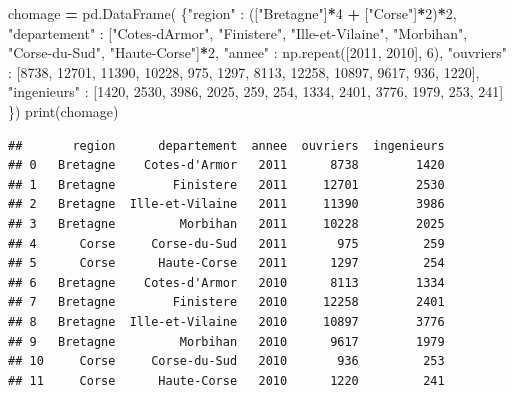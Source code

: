 \documentclass[
  12pt,
]{book}
\newenvironment{Shaded}{\begin{snugshade}}{\end{snugshade}}
\newcommand{\BuiltInTok}[1]{#1}
\newcommand{\DecValTok}[1]{\textcolor[rgb]{0.00,0.00,0.81}{#1}}
\newcommand{\NormalTok}[1]{#1}
\newcommand{\OperatorTok}[1]{\textcolor[rgb]{0.81,0.36,0.00}{\textbf{#1}}}
\newcommand{\StringTok}[1]{\textcolor[rgb]{0.31,0.60,0.02}{#1}}
\numberwithin{equation}{section}
\numberwithin{countremarque}{section}
\begin{document}
\begin{Shaded}
\begin{Highlighting}[]
\NormalTok{chomage }\OperatorTok{=}\NormalTok{ pd.DataFrame(}
\NormalTok{    \{}\StringTok{"region"}\NormalTok{ : ([}\StringTok{"Bretagne"}\NormalTok{]}\OperatorTok{*}\DecValTok{4} \OperatorTok{+}\NormalTok{ [}\StringTok{"Corse"}\NormalTok{]}\OperatorTok{*}\DecValTok{2}\NormalTok{)}\OperatorTok{*}\DecValTok{2}\NormalTok{,}
     \StringTok{"departement"}\NormalTok{ : [}\StringTok{"Cotes{-}d\textquotesingle{}Armor"}\NormalTok{, }\StringTok{"Finistere"}\NormalTok{,}
                      \StringTok{"Ille{-}et{-}Vilaine"}\NormalTok{, }\StringTok{"Morbihan"}\NormalTok{,}
                      \StringTok{"Corse{-}du{-}Sud"}\NormalTok{, }\StringTok{"Haute{-}Corse"}\NormalTok{]}\OperatorTok{*}\DecValTok{2}\NormalTok{,}
     \StringTok{"annee"}\NormalTok{ : np.repeat([}\DecValTok{2011}\NormalTok{, }\DecValTok{2010}\NormalTok{], }\DecValTok{6}\NormalTok{),}
     \StringTok{"ouvriers"}\NormalTok{ : [}\DecValTok{8738}\NormalTok{, }\DecValTok{12701}\NormalTok{, }\DecValTok{11390}\NormalTok{, }\DecValTok{10228}\NormalTok{, }\DecValTok{975}\NormalTok{, }\DecValTok{1297}\NormalTok{,}
                   \DecValTok{8113}\NormalTok{, }\DecValTok{12258}\NormalTok{, }\DecValTok{10897}\NormalTok{, }\DecValTok{9617}\NormalTok{, }\DecValTok{936}\NormalTok{, }\DecValTok{1220}\NormalTok{],}
     \StringTok{"ingenieurs"}\NormalTok{ : [}\DecValTok{1420}\NormalTok{, }\DecValTok{2530}\NormalTok{, }\DecValTok{3986}\NormalTok{, }\DecValTok{2025}\NormalTok{, }\DecValTok{259}\NormalTok{, }\DecValTok{254}\NormalTok{,}
                     \DecValTok{1334}\NormalTok{, }\DecValTok{2401}\NormalTok{, }\DecValTok{3776}\NormalTok{, }\DecValTok{1979}\NormalTok{, }\DecValTok{253}\NormalTok{, }\DecValTok{241}\NormalTok{]}
\NormalTok{    \})}
\BuiltInTok{print}\NormalTok{(chomage)}
\end{Highlighting}
\end{Shaded}

\begin{lstlisting}
##       region      departement  annee  ouvriers  ingenieurs
## 0   Bretagne    Cotes-d'Armor   2011      8738        1420
## 1   Bretagne        Finistere   2011     12701        2530
## 2   Bretagne  Ille-et-Vilaine   2011     11390        3986
## 3   Bretagne         Morbihan   2011     10228        2025
## 4      Corse     Corse-du-Sud   2011       975         259
## 5      Corse      Haute-Corse   2011      1297         254
## 6   Bretagne    Cotes-d'Armor   2010      8113        1334
## 7   Bretagne        Finistere   2010     12258        2401
## 8   Bretagne  Ille-et-Vilaine   2010     10897        3776
## 9   Bretagne         Morbihan   2010      9617        1979
## 10     Corse     Corse-du-Sud   2010       936         253
## 11     Corse      Haute-Corse   2010      1220         241
\end{lstlisting}
\end{document}
